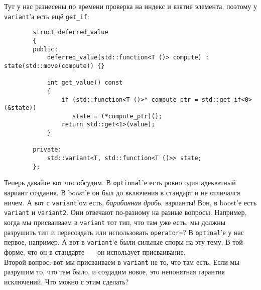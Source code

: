 \documentclass{article}
\begin{document}
    Тут у нас разнесены по времени проверка на индекс и взятие элемента, поэтому у \texttt{variant}'а есть ещё \texttt{get_if}:
    \begin{verbatim}
        struct deferred_value
        {
        public:
            deferred_value(std::function<T ()> compute) : state(std::move(compute)) {}
            
            int get_value() const
            {
                if (std::function<T ()>* compute_ptr = std::get_if<0>(&state))
                   state = (*compute_ptr)();
                return std::get<1>(value);
            }
            
        private:
            std::variant<T, std::function<T ()>> state;
        };
    \end{verbatim}
    Теперь давайте вот что обсудим. В \texttt{optional}'е есть ровно один адекватный вариант создания. В boost'е он был до включения в стандарт и не отличался ничем. А вот с \texttt{variant}'ом есть, \textit{барабанная дробь}, варианты! Вон, в boost'е есть \texttt{variant} и \texttt{variant2}. Они отвечают по-разному на разные вопросы. Например, когда мы присваиваем в \texttt{variant} тот тип, что там уже есть, мы должны разрушить тип и пересоздать или использовать \texttt{operator=}? В \texttt{optinal}'е у нас первое, например. А вот в \texttt{variant}'е были сильные споры на эту тему. В той форме, что он в стандарте~--- он использует присваивание.\\
    Второй вопрос: вот мы присваиваем в \texttt{variant} не то, что там есть. Если мы разрушим то, что там было, и создадим новое, это непонятная гарантия исключений. Что можно с этим сделать?
\end{document}
